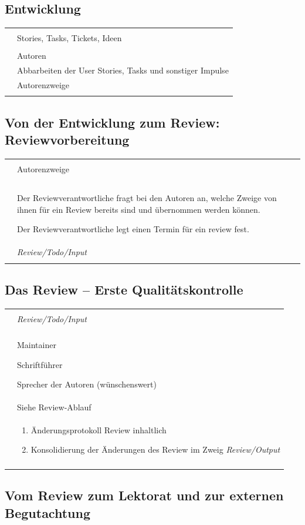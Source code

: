 \documentclass[
ngerman,
paper=a4,
asymmetric,
fontsize=10pt,
draft=false,
numbers=noenddot,
bibtotocnumbered,
footnotes=multiple,
toc=flat,
]{scrbook}
\newcommand{\Branch}[1]{\emph{#1}}
\newcommand{\Entwicklunsgprozessschritt}[8]
{
\noindent\begin{tabularx}{\linewidth}{lX}
\addlinespace\toprule\addlinespace
\multicolumn{2}{c}{Prozessschritt:
\TabHeading{\color{DefaultA}#1}}
\\\addlinespace\midrule\addlinespace \noindent\TabSub{Input} & #4
\\\addlinespace
\TabSub{Verantwortlicher} & #6
\\\addlinespace
\TabSub{Mitwirkende} & #7
\\\addlinespace
\TabSub{Tätigkeit} & #8
\\\addlinespace
\TabSub{Output} & #5
\\\addlinespace\bottomrule\addlinespace
\end{tabularx}
}
\begin{document}
\subsection{Entwicklung}

\Entwicklunsgprozessschritt
{%
Entwicklung}
{%
}
{%
}
{%
Stories, Tasks, Tickets, Ideen
}
{%
Autorenzweige}
{%
\T{Entwicklungskoordinator}}
{%
Autoren}
{%
Abbarbeiten der User Stories, Tasks und sonstiger Impulse
}

\subsection{Von der Entwicklung zum Review:
Reviewvorbereitung}

\Entwicklunsgprozessschritt
{%
Reviewvorbereitung}
{%
}
{%
}
{%
Autorenzweige
}
{%
\Branch{Review/Todo/Input}}
{%
\T{Reviewkoordinator}}
{%
}
{%
Der Reviewverantwortliche fragt bei den Autoren an, welche
Zweige von ihnen für ein Review bereits sind und übernommen
werden können.

Der Reviewverantwortliche legt einen Termin für ein review
fest. 
}

\subsection{Das Review -- Erste Qualitätskontrolle}



\Entwicklunsgprozessschritt
{%
Review}
{%
}
{%
}
{%
\Branch{Review/Todo/Input}
}
{%
\begin{enumerate}
  \item  Änderungsprotokoll Review inhaltlich
  \item Konsolidierung der Änderungen des Review im Zweig
  \Branch{Review/Output}
\end{enumerate}}
{%
\T{Reviewkoordinator}}
{%
Maintainer

Schriftführer

Sprecher der Autoren (wünschenswert)}
{%
Siehe Review-Ablauf}


\subsection{Vom Review zum Lektorat und zur externen
Begutachtung} 
\end{document}
